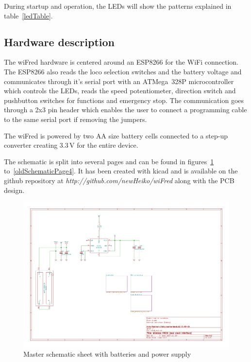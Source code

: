 \documentclass[11pt,a4paper]{scrartcl}
\begin{document}
During startup and operation, the LEDs will show the patterns explained in table~\ref{ledTable}.

\subsection{Hardware description}

The wiFred hardware is centered around an ESP8266 for the WiFi connection. The ESP8266 also reads the loco selection switches and the battery voltage and communicates through it's serial port with an ATMega~328P microcontroller which controls the LEDs, reads the speed potentiometer, direction switch and pushbutton switches for functions and emergency stop. The communication goes through a 2x3 pin header which enables the user to connect a programming cable to the same serial port if removing the jumpers.

The wiFred is powered by two AA size battery cells connected to a step-up converter creating 3.3\,V for the entire device.

The schematic is split into several pages and can be found in figures~\ref{oldSchematicPage1} to~\ref{oldSchematicPage4}. It has been created with kicad and is available on the github repository at \textit{http://github.com/newHeiko/wiFred} along with the PCB design.

\begin{figure}[tbh]
  \centering
  \includegraphics[width=\textwidth]{images/old_wfred_rev2}
  \caption{Master schematic sheet with batteries and power supply}
  \label{oldSchematicPage1}
\end{figure}
\end{document}
